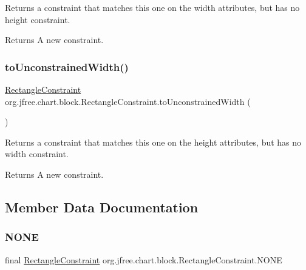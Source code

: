 Returns a constraint that matches this one on the width attributes, but has no height constraint.

\begin{DoxyReturn}{Returns}
A new constraint. 
\end{DoxyReturn}
\mbox{\label{classorg_1_1jfree_1_1chart_1_1block_1_1_rectangle_constraint_ae34f31e0e727ead56dc1e0bfa4174096}} 
\subsubsection{\texorpdfstring{to\+Unconstrained\+Width()}{toUnconstrainedWidth()}}
{\footnotesize\ttfamily \mbox{\hyperlink{classorg_1_1jfree_1_1chart_1_1block_1_1_rectangle_constraint}{Rectangle\+Constraint}} org.\+jfree.\+chart.\+block.\+Rectangle\+Constraint.\+to\+Unconstrained\+Width (\begin{DoxyParamCaption}{ }\end{DoxyParamCaption})}

Returns a constraint that matches this one on the height attributes, but has no width constraint.

\begin{DoxyReturn}{Returns}
A new constraint. 
\end{DoxyReturn}


\subsection{Member Data Documentation}
\mbox{\label{classorg_1_1jfree_1_1chart_1_1block_1_1_rectangle_constraint_ae7da6ac3fc652f76e39c1c421e8b7e99}} 
\subsubsection{\texorpdfstring{N\+O\+NE}{NONE}}
{\footnotesize\ttfamily final \mbox{\hyperlink{classorg_1_1jfree_1_1chart_1_1block_1_1_rectangle_constraint}{Rectangle\+Constraint}} org.\+jfree.\+chart.\+block.\+Rectangle\+Constraint.\+N\+O\+NE\hspace{0.3cm}{\ttfamily [static]}}

